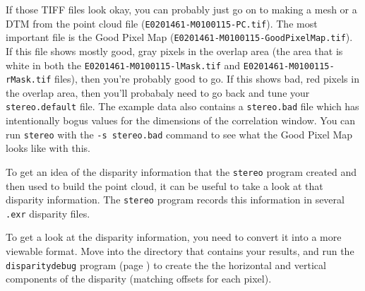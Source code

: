 % 

If those TIFF files look okay, you can probably just go on to making
a mesh or a DTM from the point cloud file
(\texttt{E0201461-M0100115-PC.tif}).  The most important file is
the Good Pixel Map (\texttt{E0201461-M0100115-GoodPixelMap.tif}).
If this file shows mostly good, gray pixels in the overlap area
(the area that is white in both the \texttt{E0201461-M0100115-lMask.tif}
and \texttt{E0201461-M0100115-rMask.tif} files), then you're probably
good to go.  If this shows bad, red pixels in the overlap area,
then you'll probabaly need to go back and tune your \texttt{stereo.default}
file.  The example data also contains a \texttt{stereo.bad} file
which has intentionally bogus values for the dimensions of the
correlation window.  You can run \texttt{stereo} with the \texttt{-s
stereo.bad} command to see what the Good Pixel Map looks like with
this.

To get an idea of the disparity information that the \texttt{stereo}
program created and then used to build the point cloud, it can be
useful to take a look at that disparity information.  The \texttt{stereo}
program records this information in several \texttt{.exr} disparity
files.

To get a look at the disparity information, you need to convert it
into a more viewable format.  Move into the directory that contains
your results, and run the \texttt{disparitydebug} program (page
\pageref{disparitydebug}) to create the the horizontal and vertical
components of the disparity (matching offsets for each pixel). 

